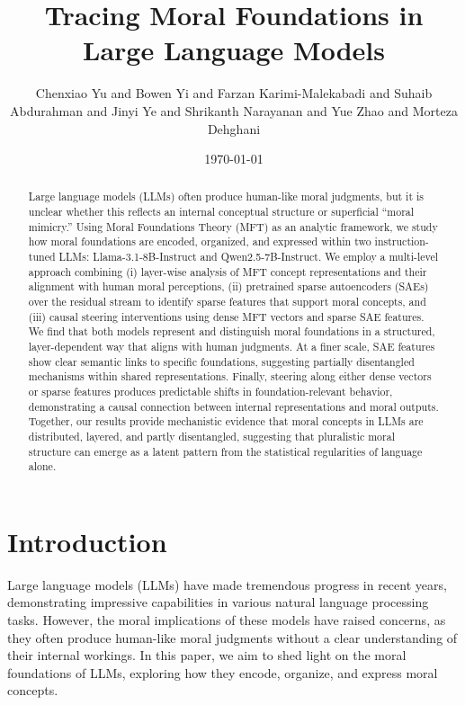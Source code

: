 \documentclass{article}
\begin{document}
\title{Tracing Moral Foundations in Large Language Models}

\author{Chenxiao Yu and Bowen Yi and Farzan Karimi-Malekabadi and Suhaib Abdurahman and Jinyi Ye and Shrikanth Narayanan and Yue Zhao and Morteza Dehghani}

\date{\today}

\maketitle

\begin{abstract}
Large language models (LLMs) often produce human-like moral judgments, but it is unclear whether this reflects an internal conceptual structure or superficial ``moral mimicry.'' Using Moral Foundations Theory (MFT) as an analytic framework, we study how moral foundations are encoded, organized, and expressed within two instruction-tuned LLMs: Llama-3.1-8B-Instruct and Qwen2.5-7B-Instruct. We employ a multi-level approach combining (i) layer-wise analysis of MFT concept representations and their alignment with human moral perceptions, (ii) pretrained sparse autoencoders (SAEs) over the residual stream to identify sparse features that support moral concepts, and (iii) causal steering interventions using dense MFT vectors and sparse SAE features. We find that both models represent and distinguish moral foundations in a structured, layer-dependent way that aligns with human judgments. At a finer scale, SAE features show clear semantic links to specific foundations, suggesting partially disentangled mechanisms within shared representations. Finally, steering along either dense vectors or sparse features produces predictable shifts in foundation-relevant behavior, demonstrating a causal connection between internal representations and moral outputs. Together, our results provide mechanistic evidence that moral concepts in LLMs are distributed, layered, and partly disentangled, suggesting that pluralistic moral structure can emerge as a latent pattern from the statistical regularities of language alone.
\end{abstract}

\section{Introduction}

Large language models (LLMs) have made tremendous progress in recent years, demonstrating impressive capabilities in various natural language processing tasks. However, the moral implications of these models have raised concerns, as they often produce human-like moral judgments without a clear understanding of their internal workings. In this paper, we aim to shed light on the moral foundations of LLMs, exploring how they encode, organize, and express moral concepts.
\end{document}
